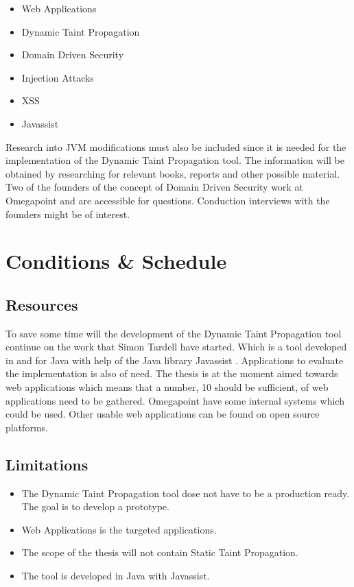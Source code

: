 \documentclass{../kththesis}
\begin{document}
	\begin{itemize}  
		\item Web Applications
		\item Dynamic Taint Propagation
		\item Domain Driven Security
		\item Injection Attacks
		\item XSS
		\item Javassist
	\end{itemize}

\noindent
Research into JVM modifications must also be included since it is needed for the implementation of the Dynamic Taint Propagation tool. The information will be obtained by researching for relevant books, reports and other possible material. Two of the founders of the concept of Domain Driven Security work at Omegapoint and are accessible for questions. Conduction interviews with the founders might be of interest.



\chapter{Conditions \& Schedule}
\section{Resources}
To save some time will the development of the Dynamic Taint Propagation tool continue on the work that Simon Tardell have started. Which is a tool developed in and for Java with help of the Java library Javassist \parencite{Javassist}. Applications to evaluate the implementation is also of need. The thesis is at the moment aimed towards web applications which means that a number, 10 should be sufficient, of web applications need to be gathered. Omegapoint have some internal systems which could be used. Other usable web applications can be found on open source platforms.


\section{Limitations}
\begin{itemize}  
	\item The Dynamic Taint Propagation tool dose not have to be a production ready. The goal is to develop a prototype.
	\item Web Applications is the targeted applications.
	\item The scope of the thesis will not contain Static Taint Propagation.
	\item The tool is developed in Java with Javassist.
\end{itemize}
\end{document}
